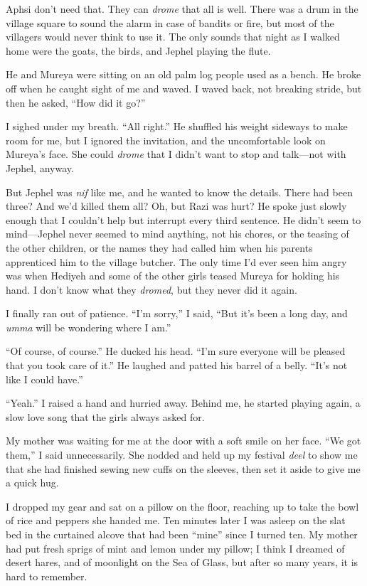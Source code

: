 Aphsi don't need that.  They can \emph{drome} that all is well.  There was
a drum in the village square to sound the alarm in case of bandits or
fire, but most of the villagers would never think to use it.  The only
sounds that night as I walked home were the goats, the birds, and
Jephel playing the flute.

He and Mureya were sitting on an old palm log people used as a bench.
He broke off when he caught sight of me and waved.  I waved back, not
breaking stride, but then he asked, ``How did it go?''

I sighed under my breath.  ``All right.''  He shuffled his weight
sideways to make room for me, but I ignored the invitation, and the
uncomfortable look on Mureya's face.  She could \emph{drome} that I didn't
want to stop and talk---not with Jephel, anyway.

But Jephel was \emph{nif} like me, and he wanted to know the details.
There had been three?  And we'd killed them all?  Oh, but Razi was
hurt?  He spoke just slowly enough that I couldn't help but interrupt
every third sentence.  He didn't seem to mind---Jephel never seemed to
mind anything, not his chores, or the teasing of the other children,
or the names they had called him when his parents apprenticed him to
the village butcher.  The only time I'd ever seen him angry was when
Hediyeh and some of the other girls teased Mureya for holding his
hand.  I don't know what they \emph{dromed}, but they never did it again.

I finally ran out of patience.  ``I'm sorry,'' I said, ``But it's been a
long day, and \emph{umma} will be wondering where I am.''

``Of course, of course.''  He ducked his head.  ``I'm sure everyone will
be pleased that you took care of it.''  He laughed and patted his
barrel of a belly.  ``It's not like I could have.''

``Yeah.''  I raised a hand and hurried away.  Behind me, he started
playing again, a slow love song that the girls always asked for.

My mother was waiting for me at the door with a soft smile on her
face.  ``We got them,'' I said unnecessarily.  She nodded and held up my
festival \emph{deel} to show me that she had finished sewing new cuffs on
the sleeves, then set it aside to give me a quick hug.

I dropped my gear and sat on a pillow on the floor, reaching up to
take the bowl of rice and peppers she handed me.  Ten minutes later I
was asleep on the slat bed in the curtained alcove that had been
``mine'' since I turned ten.  My mother had put fresh sprigs of mint and
lemon under my pillow; I think I dreamed of desert hares, and of
moonlight on the Sea of Glass, but after so many years, it is hard to
remember.

